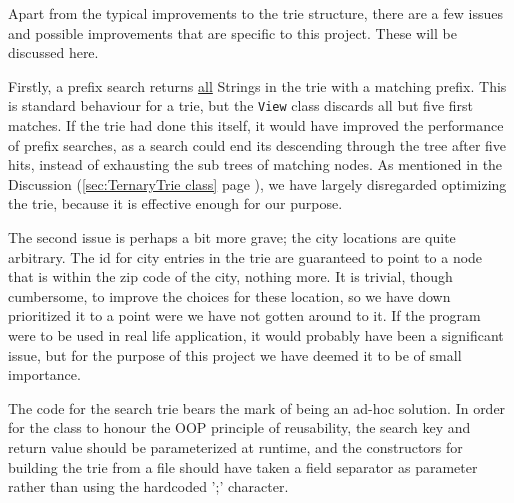 Apart from the typical improvements to the trie structure, there are a few issues and possible improvements that are specific to this project. These will be discussed here.

Firstly, a prefix search returns \underline{all} Strings in the trie with a matching prefix.
This is standard behaviour for a trie, but the \texttt{View} class discards all but five first matches. If the trie had done this itself, it would have improved the performance of prefix searches, as a search could end its descending through the tree after five hits, instead of exhausting the sub trees of matching nodes. As mentioned in the Discussion (\ref{sec:TernaryTrie class} page \pageref{sec:TernaryTrie class}),
we have largely disregarded optimizing the trie, because it is effective enough for our purpose.

The second issue is perhaps a bit more grave; the city locations are quite arbitrary.
The id for city entries in the trie are guaranteed to point to a node that is within the zip code of the city, nothing more. It is trivial, though cumbersome, to improve the choices for these location, so we have down prioritized it to a point were we have not gotten around to it.
If the program were to be used in real life application, it would probably have been a significant issue, but for the purpose of this project we have deemed it to be of small importance.

The code for the search trie bears the mark of being an ad-hoc solution. In order for the class to honour the OOP principle of reusability, the search key and return value should be parameterized at runtime, and the constructors for building the trie from a file should have taken a field separator as parameter rather than using the hardcoded ';' character.
